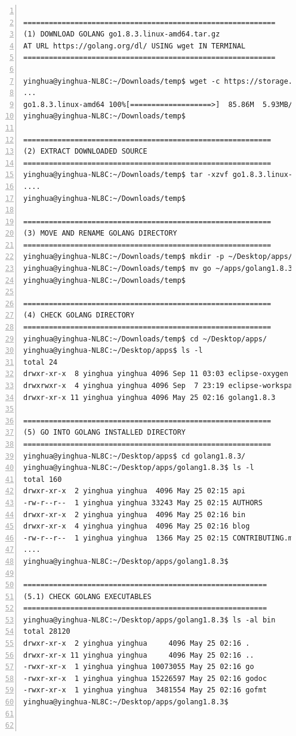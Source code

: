 \begin{lstlisting}[breaklines, frame=single, numbers=left, caption={Linux command for Golang compiler installation}, label=commandline-02]       

===========================================================
(1) DOWNLOAD GOLANG go1.8.3.linux-amd64.tar.gz
AT URL https://golang.org/dl/ USING wget IN TERMINAL
=========================================================== 

yinghua@yinghua-NL8C:~/Downloads/temp$ wget -c https://storage.googleapis.com/golang/go1.8.3.linux-amd64.tar.gz
... 
go1.8.3.linux-amd64 100%[===================>]  85.86M  5.93MB/s    in 14s     
yinghua@yinghua-NL8C:~/Downloads/temp$

==========================================================
(2) EXTRACT DOWNLOADED SOURCE
==========================================================
yinghua@yinghua-NL8C:~/Downloads/temp$ tar -xzvf go1.8.3.linux-amd64.tar.gz 
.... 
yinghua@yinghua-NL8C:~/Downloads/temp$

==========================================================
(3) MOVE AND RENAME GOLANG DIRECTORY
==========================================================
yinghua@yinghua-NL8C:~/Downloads/temp$ mkdir -p ~/Desktop/apps/golang1.8.3
yinghua@yinghua-NL8C:~/Downloads/temp$ mv go ~/apps/golang1.8.3
yinghua@yinghua-NL8C:~/Downloads/temp$

==========================================================
(4) CHECK GOLANG DIRECTORY
==========================================================
yinghua@yinghua-NL8C:~/Downloads/temp$ cd ~/Desktop/apps/ 
yinghua@yinghua-NL8C:~/Desktop/apps$ ls -l
total 24
drwxr-xr-x  8 yinghua yinghua 4096 Sep 11 03:03 eclipse-oxygen
drwxrwxr-x  4 yinghua yinghua 4096 Sep  7 23:19 eclipse-workspace
drwxr-xr-x 11 yinghua yinghua 4096 May 25 02:16 golang1.8.3

==========================================================
(5) GO INTO GOLANG INSTALLED DIRECTORY
==========================================================
yinghua@yinghua-NL8C:~/Desktop/apps$ cd golang1.8.3/
yinghua@yinghua-NL8C:~/Desktop/apps/golang1.8.3$ ls -l
total 160
drwxr-xr-x  2 yinghua yinghua  4096 May 25 02:15 api
-rw-r--r--  1 yinghua yinghua 33243 May 25 02:15 AUTHORS
drwxr-xr-x  2 yinghua yinghua  4096 May 25 02:16 bin
drwxr-xr-x  4 yinghua yinghua  4096 May 25 02:16 blog
-rw-r--r--  1 yinghua yinghua  1366 May 25 02:15 CONTRIBUTING.md
....
yinghua@yinghua-NL8C:~/Desktop/apps/golang1.8.3$

=========================================================
(5.1) CHECK GOLANG EXECUTABLES
=========================================================
yinghua@yinghua-NL8C:~/Desktop/apps/golang1.8.3$ ls -al bin
total 28120
drwxr-xr-x  2 yinghua yinghua     4096 May 25 02:16 .
drwxr-xr-x 11 yinghua yinghua     4096 May 25 02:16 ..
-rwxr-xr-x  1 yinghua yinghua 10073055 May 25 02:16 go
-rwxr-xr-x  1 yinghua yinghua 15226597 May 25 02:16 godoc
-rwxr-xr-x  1 yinghua yinghua  3481554 May 25 02:16 gofmt
yinghua@yinghua-NL8C:~/Desktop/apps/golang1.8.3$



\end{lstlisting}
